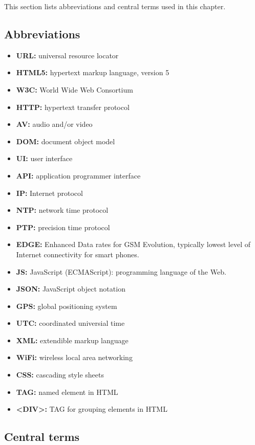 This section lists abbreviations and central terms used in this chapter.

\subsection{Abbreviations}

\begin{itemize}
\item{\textbf{URL:} universal resource locator}
\item{\textbf{HTML5:} hypertext markup language, version 5}
\item{\textbf{W3C:} World Wide Web Consortium}
\item{\textbf{HTTP:} hypertext transfer protocol}
\item{\textbf{AV:} audio and/or video}
\item{\textbf{DOM:} document object model}
\item{\textbf{UI:} user interface}
\item{\textbf{API:} application programmer interface}
\item{\textbf{IP:} Internet protocol}
\item{\textbf{NTP:} network time protocol}
\item{\textbf{PTP:} precision time protocol}
\item{\textbf{EDGE:} Enhanced Data rates for GSM Evolution, typically lowest level of Internet connectivity for smart phones.}
\item{\textbf{JS:}} JavaScript (ECMAScript): programming language of the Web.
\item{\textbf{JSON:} JavaScript object notation}
\item{\textbf{GPS:} global positioning system}
\item{\textbf{UTC:} coordinated universial time}
\item{\textbf{XML:} extendible markup language}
\item{\textbf{WiFi:} wireless local area networking}
\item{\textbf{CSS:}} cascading style sheets
\item{\textbf{TAG:}} named element in HTML
\item{\textbf{{\textless}DIV{\textgreater}:}} TAG for grouping elements in HTML


\end{itemize}


\subsection{Central terms}

